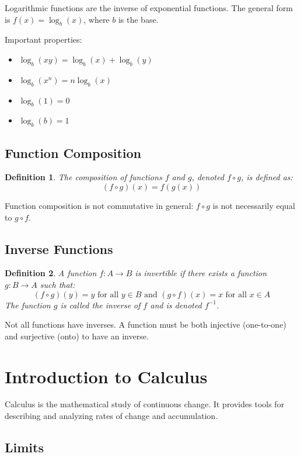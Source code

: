 \documentclass[12pt,a4paper]{article}
\newtheorem{definition}{Definition}
\begin{document}
Logarithmic functions are the inverse of exponential functions. The general form is $f(x) = \log_b(x)$, where $b$ is the base.

Important properties:
\begin{itemize}
    \item $\log_b(xy) = \log_b(x) + \log_b(y)$
    \item $\log_b(x^n) = n\log_b(x)$
    \item $\log_b(1) = 0$
    \item $\log_b(b) = 1$
\end{itemize}

\subsection{Function Composition}

\begin{definition}
The composition of functions $f$ and $g$, denoted $f \circ g$, is defined as:
\[ (f \circ g)(x) = f(g(x)) \]
\end{definition}

Function composition is not commutative in general: $f \circ g$ is not necessarily equal to $g \circ f$.

\subsection{Inverse Functions}

\begin{definition}
A function $f: A \to B$ is invertible if there exists a function $g: B \to A$ such that:
\[ (f \circ g)(y) = y \text{ for all } y \in B \text{ and } (g \circ f)(x) = x \text{ for all } x \in A \]
The function $g$ is called the inverse of $f$ and is denoted $f^{-1}$.
\end{definition}

Not all functions have inverses. A function must be both injective (one-to-one) and surjective (onto) to have an inverse.

\section{Introduction to Calculus}

Calculus is the mathematical study of continuous change. It provides tools for describing and analyzing rates of change and accumulation.

\subsection{Limits}
\end{document}
